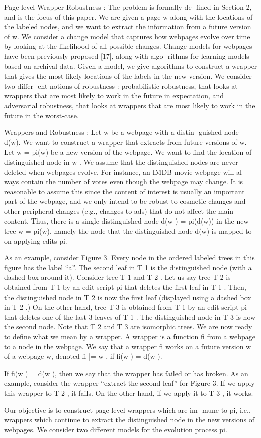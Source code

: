Page-level Wrapper Robustness : The problem is formally de-
fined in Section 2, and is the focus of this paper. We are given a
page w along with the locations of the labeled nodes, and we want
to extract the information from a future version of w. We consider
a change model that captures how webpages evolve over time by
looking at the likelihood of all possible changes. Change models
for webpages have been previously proposed [17], along with algo-
rithms for learning models based on archival data. Given a model,
we give algorithms to construct a wrapper that gives the most likely
locations of the labels in the new version. We consider two differ-
ent notions of robustness : probabilistic robustness, that looks at
wrappers that are most likely to work in the future in expectation,
and adversarial robustness, that looks at wrappers that are most
likely to work in the future in the worst-case.

Wrappers and Robustness : Let w be a webpage with a distin-
guished node d(w). We want to construct a wrapper that extracts
from future versions of w. Let w = pi(w) be a new version of the
webpage. We want to find the location of distinguished node in w .
We assume that the distinguished nodes are never deleted when
webpages evolve. For instance, an IMDB movie webpage will al-
ways contain the number of votes even though the webpage may
change. It is reasonable to assume this since the content of interest
is usually an important part of the webpage, and we only intend to
be robust to cosmetic changes and other peripheral changes (e.g.,
changes to ads) that do not affect the main content. Thus, there
is a single distinguished node d(w ) = pi(d(w)) in the new tree
w = pi(w), namely the node that the distinguished node d(w) is
mapped to on applying edits pi.

As an example, consider Figure 3. Every node in the ordered
labeled trees in this figure has the label “a”. The second leaf in T 1 is
the distinguished node (with a dashed box around it). Consider tree
T 1 and T 2 . Let us say tree T 2 is obtained from T 1 by an edit script
pi that deletes the first leaf in T 1 . Then, the distinguished node in
T 2 is now the first leaf (displayed using a dashed box in T 2 .) On
the other hand, tree T 3 is obtained from T 1 by an edit script pi that
deletes one of the last 3 leaves of T 1 . The distinguished node in T 3
is now the second node. Note that T 2 and T 3 are isomorphic trees.
We are now ready to define what we mean by a wrapper.
A wrapper is a function fi from a webpage to a node in the
webpage. We say that a wrapper fi works on a future version
w of a webpage w, denoted fi |= w , if fi(w ) = d(w ).

If fi(w ) = d(w ), then we say that the wrapper has failed or has
broken. As an example, consider the wrapper “extract the second
leaf” for Figure 3. If we apply this wrapper to T 2 , it fails. On the
other hand, if we apply it to T 3 , it works.

Our objective is to construct page-level wrappers which are im-
mune to pi, i.e., wrappers which continue to extract the distinguished
node in the new versions of webpages. We consider two different
models for the evolution process pi.

